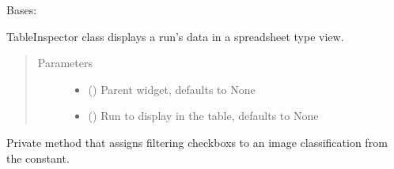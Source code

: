 \documentclass[letterpaper,10pt,english]{sphinxmanual}
\begin{document}
\begin{fulllineitems}
\label{\detokenize{polo.widgets:polo.widgets.table_inspector.TableInspector}}
Bases: 

TableInspector class displays a run’s data in a spreadsheet
type view.
\begin{quote}\begin{description}
\item[{Parameters}] \leavevmode\begin{itemize}
\item {} 
 (\sphinxstyleliteralemphasis{\sphinxupquote{, }}) \textendash{} Parent widget, defaults to None

\item {} 
 ({\hyperref[\detokenize{polo.crystallography:polo.crystallography.run.Run}]{}}\sphinxstyleliteralemphasis{\sphinxupquote{, }}) \textendash{} Run to display in the table, defaults to None

\end{itemize}

\end{description}\end{quote}

\begin{fulllineitems}
\label{\detokenize{polo.widgets:polo.widgets.table_inspector.TableInspector._assign_checkboxes_to_class}}
Private method that assigns filtering checkboxs to an
image classification from the  constant.


\end{fulllineitems}
\end{fulllineitems}
\end{document}
